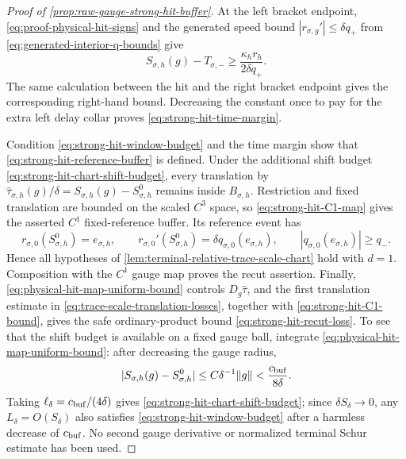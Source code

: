 \begin{proof}[Proof of
\cref{prop:raw-gauge-strong-hit-buffer}]
At the left bracket endpoint,
\cref{eq:proof-physical-hit-signs} and
the generated speed bound
\(|r_{\sigma,g}'|\le\delta q_+\) from
\cref{eq:generated-interior-q-bounds} give
\begin{equation*}
 S_{\sigma,h}(g)-T_{\sigma,-}
 \ge\frac{\kappa_hr_h}{2\delta q_+}.
\end{equation*}
The same calculation between the hit and the right bracket endpoint gives
the corresponding right-hand bound.  Decreasing the constant once to pay
for the extra left delay collar proves
\cref{eq:strong-hit-time-margin}.

Condition \cref{eq:strong-hit-window-budget} and the time margin show that
\cref{eq:strong-hit-reference-buffer} is defined.  Under the additional
shift budget \cref{eq:strong-hit-chart-shift-budget}, every translation by
\(\widehat\tau_{\sigma,h}(g)/\delta
 =S_{\sigma,h}(g)-S_{\sigma,h}^0\)
remains inside \(B_{\sigma,h}\).  Restriction and fixed translation are
bounded on the scaled \(C^3\) space, so
\cref{eq:strong-hit-C1-map} gives the asserted \(C^1\) fixed-reference
buffer.  Its reference event has
\begin{equation*}
 r_{\sigma,0}(S_{\sigma,h}^0)=e_{\sigma,h},\qquad
 r_{\sigma,0}'(S_{\sigma,h}^0)
 =\delta q_{\sigma,0}(e_{\sigma,h}),\qquad
 |q_{\sigma,0}(e_{\sigma,h})|\ge q_-.
\end{equation*}
Hence all hypotheses of
\cref{lem:terminal-relative-trace-scale-chart} hold with \(d=1\).
Composition with the \(C^1\) gauge map proves the recut assertion.  Finally,
\cref{eq:physical-hit-map-uniform-bound} controls
\(D_g\widehat\tau\), and the first translation estimate in
\cref{eq:trace-scale-translation-losses}, together with
\cref{eq:strong-hit-C1-bound}, gives the safe ordinary-product bound
\cref{eq:strong-hit-recut-loss}.  To see that the shift budget is available
on a fixed gauge ball, integrate
\cref{eq:physical-hit-map-uniform-bound}: after decreasing the gauge radius,
\[
 |S_{\sigma,h}(g)-S_{\sigma,h}^0|
 \le C\delta^{-1}\|g\|
 <\frac{c_{\rm buf}}{8\delta}.
\]
Taking \(\ell_\delta=c_{\rm buf}/(4\delta)\) gives
\cref{eq:strong-hit-chart-shift-budget}; since
\(\delta S_\delta\to0\), any \(L_\delta=O(S_\delta)\) also satisfies
\cref{eq:strong-hit-window-budget} after a harmless decrease of
\(c_{\rm buf}\).  No second gauge derivative or normalized terminal Schur
estimate has been used.
\end{proof}

